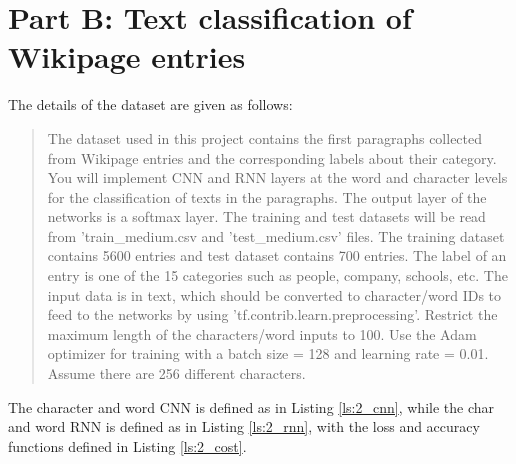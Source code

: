 \section{Part B: Text classification of Wikipage entries}
\label{part2}
The details of the dataset are given as follows:
\begin{quote}
The dataset used in this project contains the first paragraphs collected from Wikipage entries and the corresponding labels about their category. You will implement CNN and RNN layers at the word and character levels for the classification of texts in the paragraphs. The output layer of the networks is a softmax layer. The training and test datasets will be read from 'train\_medium.csv and 'test\_medium.csv' files. The training dataset contains 5600 entries and test dataset contains 700 entries. The label of an entry is one of the 15 categories such as people, company, schools, etc. The input data is in text, which should be converted to character/word IDs to feed to the networks by using 'tf.contrib.learn.preprocessing'. Restrict the maximum length of the characters/word inputs to 100. Use the Adam optimizer for training with a batch size = 128 and learning rate = 0.01. Assume there are 256 different characters.
\end{quote}

The character and word CNN is defined as in Listing \ref{ls:2_cnn}, while the char and word RNN is defined as in Listing \ref{ls:2_rnn}, with the loss and accuracy functions defined in Listing \ref{ls:2_cost}.

